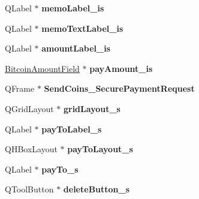 \begin{DoxyCompactItemize}
\item 
\mbox{\label{class_ui___send_coins_entry_a064fbc36dc365f9aa5727530aca32ccf}} 
Q\+Label $\ast$ {\bfseries memo\+Label\+\_\+is}
\item 
\mbox{\label{class_ui___send_coins_entry_a3e05c1e6073be7727722451e5236c839}} 
Q\+Label $\ast$ {\bfseries memo\+Text\+Label\+\_\+is}
\item 
\mbox{\label{class_ui___send_coins_entry_a5849112768021ef42258f74073f51a2b}} 
Q\+Label $\ast$ {\bfseries amount\+Label\+\_\+is}
\item 
\mbox{\label{class_ui___send_coins_entry_a27f3ef04a4d542decf5031549514d2c4}} 
\mbox{\hyperlink{class_bitcoin_amount_field}{Bitcoin\+Amount\+Field}} $\ast$ {\bfseries pay\+Amount\+\_\+is}
\item 
\mbox{\label{class_ui___send_coins_entry_a5b157b2f88a2ca9701b86fbb55873ca0}} 
Q\+Frame $\ast$ {\bfseries Send\+Coins\+\_\+\+Secure\+Payment\+Request}
\item 
\mbox{\label{class_ui___send_coins_entry_a0ae97faa8979dc2d061338dbfee370f9}} 
Q\+Grid\+Layout $\ast$ {\bfseries grid\+Layout\+\_\+s}
\item 
\mbox{\label{class_ui___send_coins_entry_a60eae5ca0102d438a6533a851e3dc21c}} 
Q\+Label $\ast$ {\bfseries pay\+To\+Label\+\_\+s}
\item 
\mbox{\label{class_ui___send_coins_entry_a13a47161f7f6c584b66c13b2c22b66f3}} 
Q\+H\+Box\+Layout $\ast$ {\bfseries pay\+To\+Layout\+\_\+s}
\item 
\mbox{\label{class_ui___send_coins_entry_a700f160691a97957ab207d241405b76e}} 
Q\+Label $\ast$ {\bfseries pay\+To\+\_\+s}
\item 
\mbox{\label{class_ui___send_coins_entry_ad6fdf85747845068f3b7dbf62ffe62ed}} 
Q\+Tool\+Button $\ast$ {\bfseries delete\+Button\+\_\+s}
\item 

\end{DoxyCompactItemize}
